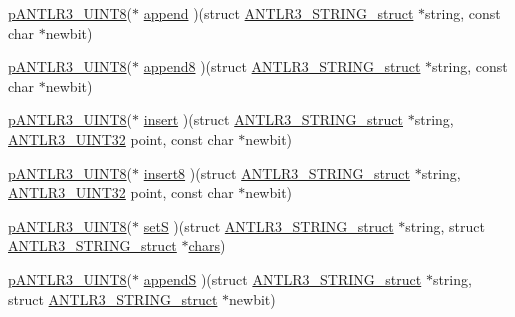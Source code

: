 \begin{DoxyCompactItemize}
\item 
\hyperlink{antlr3defs_8h_a95c800abcac5d607fd9e3e775ace78c5}{p\-A\-N\-T\-L\-R3\-\_\-\-U\-I\-N\-T8}($\ast$ \hyperlink{struct_a_n_t_l_r3___s_t_r_i_n_g__struct_a4d1a7db3a22fe7f15969cf4fc4c6a16c}{append} )(struct \hyperlink{struct_a_n_t_l_r3___s_t_r_i_n_g__struct}{A\-N\-T\-L\-R3\-\_\-\-S\-T\-R\-I\-N\-G\-\_\-struct} $\ast$string, const char $\ast$newbit)
\item 
\hyperlink{antlr3defs_8h_a95c800abcac5d607fd9e3e775ace78c5}{p\-A\-N\-T\-L\-R3\-\_\-\-U\-I\-N\-T8}($\ast$ \hyperlink{struct_a_n_t_l_r3___s_t_r_i_n_g__struct_a6d95e67b4d97cceea4d58248eb625c92}{append8} )(struct \hyperlink{struct_a_n_t_l_r3___s_t_r_i_n_g__struct}{A\-N\-T\-L\-R3\-\_\-\-S\-T\-R\-I\-N\-G\-\_\-struct} $\ast$string, const char $\ast$newbit)
\item 
\hyperlink{antlr3defs_8h_a95c800abcac5d607fd9e3e775ace78c5}{p\-A\-N\-T\-L\-R3\-\_\-\-U\-I\-N\-T8}($\ast$ \hyperlink{struct_a_n_t_l_r3___s_t_r_i_n_g__struct_a1aa58841c89fa55e6deee6b769aca462}{insert} )(struct \hyperlink{struct_a_n_t_l_r3___s_t_r_i_n_g__struct}{A\-N\-T\-L\-R3\-\_\-\-S\-T\-R\-I\-N\-G\-\_\-struct} $\ast$string, \hyperlink{antlr3defs_8h_ac41f744abd0fd25144b9eb9d11b1dfd1}{A\-N\-T\-L\-R3\-\_\-\-U\-I\-N\-T32} point, const char $\ast$newbit)
\item 
\hyperlink{antlr3defs_8h_a95c800abcac5d607fd9e3e775ace78c5}{p\-A\-N\-T\-L\-R3\-\_\-\-U\-I\-N\-T8}($\ast$ \hyperlink{struct_a_n_t_l_r3___s_t_r_i_n_g__struct_a0a8591989024d901209c399afed5d576}{insert8} )(struct \hyperlink{struct_a_n_t_l_r3___s_t_r_i_n_g__struct}{A\-N\-T\-L\-R3\-\_\-\-S\-T\-R\-I\-N\-G\-\_\-struct} $\ast$string, \hyperlink{antlr3defs_8h_ac41f744abd0fd25144b9eb9d11b1dfd1}{A\-N\-T\-L\-R3\-\_\-\-U\-I\-N\-T32} point, const char $\ast$newbit)
\item 
\hyperlink{antlr3defs_8h_a95c800abcac5d607fd9e3e775ace78c5}{p\-A\-N\-T\-L\-R3\-\_\-\-U\-I\-N\-T8}($\ast$ \hyperlink{struct_a_n_t_l_r3___s_t_r_i_n_g__struct_a3911d5010e30a8f786a2dbd29887d585}{set\-S} )(struct \hyperlink{struct_a_n_t_l_r3___s_t_r_i_n_g__struct}{A\-N\-T\-L\-R3\-\_\-\-S\-T\-R\-I\-N\-G\-\_\-struct} $\ast$string, struct \hyperlink{struct_a_n_t_l_r3___s_t_r_i_n_g__struct}{A\-N\-T\-L\-R3\-\_\-\-S\-T\-R\-I\-N\-G\-\_\-struct} $\ast$\hyperlink{struct_a_n_t_l_r3___s_t_r_i_n_g__struct_a7be84d1554437ab99377ab3c623ebd24}{chars})
\item 
\hyperlink{antlr3defs_8h_a95c800abcac5d607fd9e3e775ace78c5}{p\-A\-N\-T\-L\-R3\-\_\-\-U\-I\-N\-T8}($\ast$ \hyperlink{struct_a_n_t_l_r3___s_t_r_i_n_g__struct_a22dfad5a291577c40da7adb57ea2f6a2}{append\-S} )(struct \hyperlink{struct_a_n_t_l_r3___s_t_r_i_n_g__struct}{A\-N\-T\-L\-R3\-\_\-\-S\-T\-R\-I\-N\-G\-\_\-struct} $\ast$string, struct \hyperlink{struct_a_n_t_l_r3___s_t_r_i_n_g__struct}{A\-N\-T\-L\-R3\-\_\-\-S\-T\-R\-I\-N\-G\-\_\-struct} $\ast$newbit)

\end{DoxyCompactItemize}

